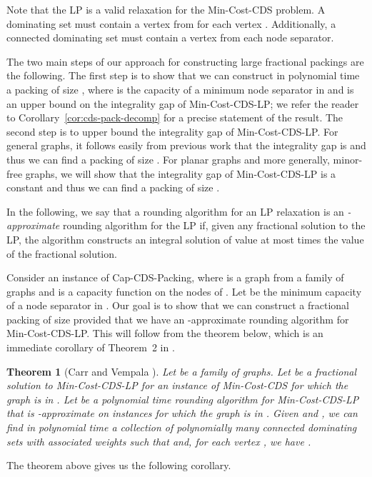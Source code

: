 \documentclass[11pt]{article}
\newtheorem{theorem}[lemma]{Theorem}
\def\prob#1{\textsf{\textup{#1}}\xspace}
\def\minCDSlp{\prob{\minCDS-LP}}
\def\capCDSpack{\prob{Cap-CDS-Packing}}
\def\minCDS{\prob{Min-Cost-CDS}}
\begin{document}
Note that the LP is a valid relaxation for the \minCDS problem. A
dominating set must contain a vertex from  for each
vertex . Additionally, a connected dominating set must contain a
vertex from each node separator.

The two main steps of our approach for constructing large fractional
packings are the following. The first step is to show that we can
construct in polynomial time a packing of size , where
 is the capacity of a minimum node separator in  and  is an
upper bound on the integrality gap of \minCDSlp; we refer the reader
to Corollary~\ref{cor:cds-pack-decomp} for a precise statement of the
result.  The second step is to upper bound the integrality gap of
\minCDSlp. For general graphs, it follows easily from previous work
that the integrality gap is  and thus we can find a
packing of size . For planar graphs and more
generally, minor-free graphs, we will show that the integrality gap
of \minCDSlp is a constant and thus we can find a packing of size
.

In the following, we say that a rounding algorithm  for an LP
relaxation is an \emph{-approximate} rounding algorithm for the
LP if, given any fractional solution to the LP, the algorithm
constructs an integral solution of value at most  times the value
of the fractional solution.

Consider an instance  of \capCDSpack, where
 is a graph from a family  of graphs and 
is a capacity function on the nodes of . Let  be the minimum
capacity of a node separator in . Our goal is to show that we can
construct a fractional packing of size  provided that we
have an -approximate rounding algorithm for \minCDSlp.  This will
follow from the theorem below, which is an immediate corollary of
Theorem~{2} in \cite{CarrV02}.

\begin{theorem}[Carr and Vempala \cite{CarrV02}] \label{thm:convex-decomp}
	Let  be a family of graphs. Let  be a fractional
	solution to \minCDSlp for an instance of \minCDS for which the
	graph  is in . Let  be a polynomial time rounding
	algorithm for \minCDSlp that is -approximate on instances for
	which the graph is in . Given  and , we can find
	in polynomial time a collection of polynomially many connected
	dominating sets  with associated weights
	 such that  and, for each vertex , we have .
\end{theorem}

\noindent
The theorem above gives us the following corollary.
\end{document}
